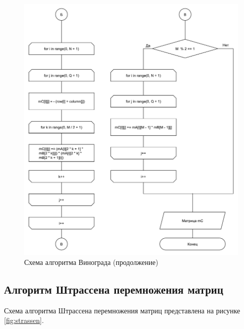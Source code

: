 \begin{figure}
	\centering
	\includegraphics[width=0.9\linewidth]{images/winograd2}
	\caption{Схема алгоритма Винограда (продолжение)}
	\label{fig:winograd2}
\end{figure}

\newpage

\subsection{Алгоритм Штрассена перемножения матриц}

Схема алгоритма Штрассена перемножения матриц представлена на рисунке \ref{fig:strassen}.

